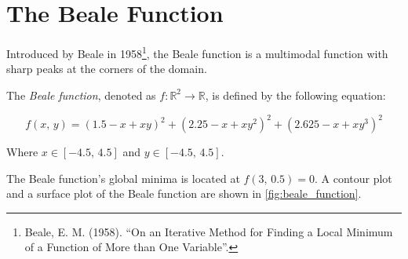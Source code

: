 \section{The Beale Function}
\label{sec:beale_function}

  Introduced by Beale in 1958\footnote{
    Beale, E. M. (1958). \enquote{On an Iterative Method for Finding a Local 
    Minimum of a Function of More than One Variable}. 
  }, the Beale function is a multimodal function with sharp peaks at the corners
  of the domain.

  \begin{definition}
    \label{def:beale_function}
    The \emph{Beale function}, denoted as \(f: \mathbb{R}^2 \rightarrow 
    \mathbb{R}\), is defined by the following equation:

    \begin{equation}
    \label{eq:beale_function}
      f(x,\,y) = (1.5 - x + xy)^2 + (2.25 - x + xy^2)^2 + (2.625 - x + xy^3)^2
    \end{equation}

    Where \(x \in [-4.5,\,4.5]\) and \(y \in [-4.5,\,4.5]\).
  \end{definition}

  The Beale function's global minima is located at \(f(3,\,0.5) = 0\).
  A contour plot and a surface plot of the Beale function are shown in
  \vref{fig:beale_function}.

